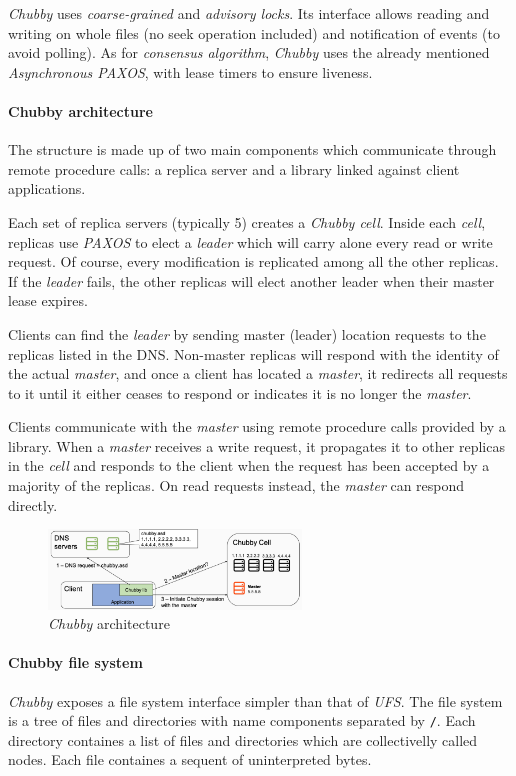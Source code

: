 \emph{Chubby} uses \emph{coarse-grained} and \emph{advisory locks}. Its
interface allows reading and writing on whole files (no seek operation included)
and notification of events (to avoid polling). As for \emph{consensus algorithm},
\emph{Chubby} uses the already mentioned \emph{Asynchronous PAXOS}, with lease
timers to ensure liveness.

\paragraph{Chubby architecture}
The structure is made up of two main components which communicate through remote
procedure calls: a replica server and a library linked against client applications.

Each set of replica servers (typically 5) creates a \emph{Chubby cell}. Inside
each \emph{cell}, replicas use \emph{PAXOS} to elect a \emph{leader} which will
carry alone every read or write request. Of course, every modification is
replicated among all the other replicas. If the \emph{leader} fails, the other
replicas will elect another leader when their master lease expires.

Clients can find the \emph{leader} by sending master (leader) location requests
to the replicas listed in the DNS. Non-master replicas will respond with the
identity of the actual \emph{master}, and once a client has located a
\emph{master}, it redirects all requests to it until it either ceases to respond
or indicates it is no longer the \emph{master}.

Clients communicate with the \emph{master} using remote procedure calls provided
by a library. When a \emph{master} receives a write request, it propagates it
to other replicas in the \emph{cell} and responds to the client when the request
has been accepted by a majority of the replicas. On read requests instead, the
\emph{master} can respond directly.

\begin{figure}[ht!]
    \centering
    \includegraphics[width=0.6\textwidth]{images/chubby-design.png}
    \caption{\emph{Chubby} architecture}
\end{figure}

\paragraph{Chubby file system}
\emph{Chubby} exposes a file system interface simpler than that of \emph{UFS}.
The file system is a tree of files and directories with name components separated
by \texttt{/}. Each directory containes a list of files and directories which
are collectivelly called nodes. Each file containes a sequent of uninterpreted
bytes.

